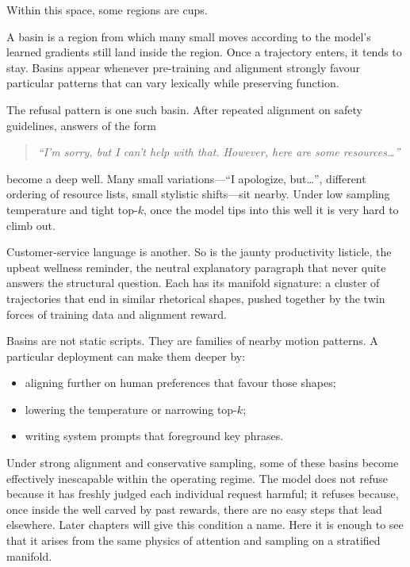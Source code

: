 \documentclass[12pt,a4paper]{article}
\begin{document}
Within this space, some regions are cups.

A basin is a region from which many small moves according to the model's learned gradients still land inside the region. Once a trajectory enters, it tends to stay. Basins appear whenever pre-training and alignment strongly favour particular patterns that can vary lexically while preserving function.

The refusal pattern is one such basin. After repeated alignment on safety guidelines, answers of the form

\begin{quote}
\emph{``I'm sorry, but I can't help with that. However, here are some resources\ldots''}
\end{quote}

become a deep well. Many small variations---``I apologize, but\ldots'', different ordering of resource lists, small stylistic shifts---sit nearby. Under low sampling temperature and tight top-$k$, once the model tips into this well it is very hard to climb out.

Customer-service language is another. So is the jaunty productivity listicle, the upbeat wellness reminder, the neutral explanatory paragraph that never quite answers the structural question. Each has its manifold signature: a cluster of trajectories that end in similar rhetorical shapes, pushed together by the twin forces of training data and alignment reward.

Basins are not static scripts. They are families of nearby motion patterns. A particular deployment can make them deeper by:

\begin{itemize}
  \item aligning further on human preferences that favour those shapes;
  \item lowering the temperature or narrowing top-$k$;
  \item writing system prompts that foreground key phrases.
\end{itemize}

Under strong alignment and conservative sampling, some of these basins become effectively inescapable within the operating regime. The model does not refuse because it has freshly judged each individual request harmful; it refuses because, once inside the well carved by past rewards, there are no easy steps that lead elsewhere. Later chapters will give this condition a name. Here it is enough to see that it arises from the same physics of attention and sampling on a stratified manifold.
\end{document}
